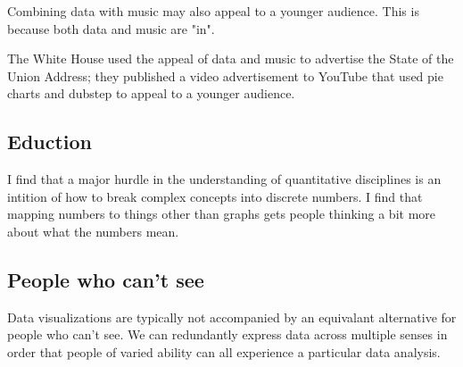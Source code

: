 \documentclass{acm_proc_article-sp}
\begin{document}
Combining data with music may also appeal to a younger audience.
This is because both data and music are "in".

The White House used the appeal of data and music to advertise the State
of the Union Address; they published a video advertisement to YouTube that
used pie charts and dubstep to appeal to a younger audience.\cite{whitehouse}

\subsection{Eduction}
I find that a major hurdle in the understanding of quantitative disciplines
is an intition of how to break complex concepts into discrete numbers.
I find that mapping numbers to things other than graphs gets people thinking
a bit more about what the numbers mean.

\subsection{People who can't see}
Data visualizations are typically not accompanied by an equivalant
alternative for people who can't see. We can redundantly express data
across multiple senses in order that people of varied ability can all
experience a particular data analysis.
\end{document}
